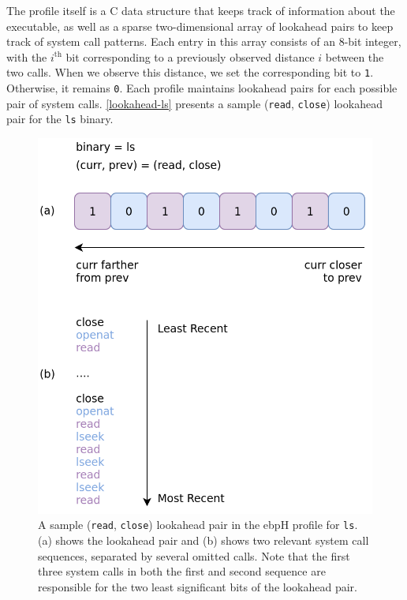 \documentclass[
  12pt]{findlay}
\newcommand{\passthrough}[1]{#1}
\begin{document}
The profile itself is a C data structure that keeps track of information
about the executable, as well as a sparse two-dimensional array of
lookahead pairs \autocite{soma07} to keep track of system call patterns.
Each entry in this array consists of an 8-bit integer, with the
\(i^\text{th}\) bit corresponding to a previously observed distance
\(i\) between the two calls. When we observe this distance, we set the
corresponding bit to \passthrough{\lstinline!1!}. Otherwise, it remains
\passthrough{\lstinline!0!}. Each profile maintains lookahead pairs for
each possible pair of system calls. \autoref{lookahead-ls} presents a
sample (\passthrough{\lstinline!read!}, \passthrough{\lstinline!close!})
lookahead pair for the \passthrough{\lstinline!ls!} binary.

\begin{figure}
\begin{center}
\includegraphics[height=0.45\paperheight]{../figures/lookahead-ls.png}
\end{center}
\caption[A sample (\lstinline{read}, \lstinline{close}) lookahead pair in the ebpH profile for \lstinline{ls}.]
{
A sample (\lstinline{read}, \lstinline{close}) lookahead pair in the ebpH profile for \lstinline{ls}.
(a) shows the lookahead pair and (b) shows two relevant system call sequences, separated by several omitted calls.
Note that the first three system calls in both the first and second sequence are responsible for
the two least significant bits of the lookahead pair.
}
\label{lookahead-ls}
\end{figure}
\end{document}
